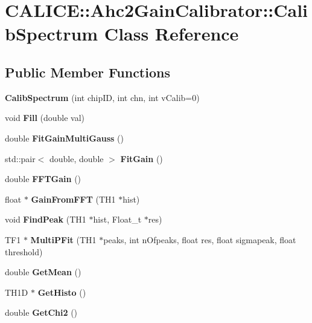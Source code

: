 \section{C\-A\-L\-I\-C\-E\-:\-:Ahc2\-Gain\-Calibrator\-:\-:Calib\-Spectrum Class Reference}
\label{classCALICE_1_1Ahc2GainCalibrator_1_1CalibSpectrum}
\subsection*{Public Member Functions}
\begin{DoxyCompactItemize}
\item 
{\bfseries Calib\-Spectrum} (int chip\-I\-D, int chn, int v\-Calib=0)\label{classCALICE_1_1Ahc2GainCalibrator_1_1CalibSpectrum_a67bcd91dbc453e55bf4fc51483522eb6}

\item 
void {\bfseries Fill} (double val)\label{classCALICE_1_1Ahc2GainCalibrator_1_1CalibSpectrum_a536be2de9ee61d690c6c5485fd14fff6}

\item 
double {\bfseries Fit\-Gain\-Multi\-Gauss} ()\label{classCALICE_1_1Ahc2GainCalibrator_1_1CalibSpectrum_a9f9f4f4130c2127e9680e825ed1a7feb}

\item 
std\-::pair$<$ double, double $>$ {\bfseries Fit\-Gain} ()\label{classCALICE_1_1Ahc2GainCalibrator_1_1CalibSpectrum_a53507513027b248d8166673d5d0bf74c}

\item 
double {\bfseries F\-F\-T\-Gain} ()\label{classCALICE_1_1Ahc2GainCalibrator_1_1CalibSpectrum_a76e65e633998a415f97d64db18ecc39f}

\item 
float $\ast$ {\bfseries Gain\-From\-F\-F\-T} (T\-H1 $\ast$hist)\label{classCALICE_1_1Ahc2GainCalibrator_1_1CalibSpectrum_ac116ca191bf1c8e02c9c8d12875e863d}

\item 
void {\bfseries Find\-Peak} (T\-H1 $\ast$hist, Float\-\_\-t $\ast$res)\label{classCALICE_1_1Ahc2GainCalibrator_1_1CalibSpectrum_aa28872130c993591075712d06a08944a}

\item 
T\-F1 $\ast$ {\bfseries Multi\-P\-Fit} (T\-H1 $\ast$peaks, int n\-Ofpeaks, float res, float sigmapeak, float threshold)\label{classCALICE_1_1Ahc2GainCalibrator_1_1CalibSpectrum_aee99f1e523134b999bbca2992d19ff5f}

\item 
double {\bfseries Get\-Mean} ()\label{classCALICE_1_1Ahc2GainCalibrator_1_1CalibSpectrum_aa30eff013ec90c1be01efa8ebc265fd6}

\item 
T\-H1\-D $\ast$ {\bfseries Get\-Histo} ()\label{classCALICE_1_1Ahc2GainCalibrator_1_1CalibSpectrum_af7e759c1725e0cf7e661c5c94145b602}

\item 
double {\bfseries Get\-Chi2} ()\label{classCALICE_1_1Ahc2GainCalibrator_1_1CalibSpectrum_a93760f7593b9c2b61b76df12e331d2b9}

\end{DoxyCompactItemize}
